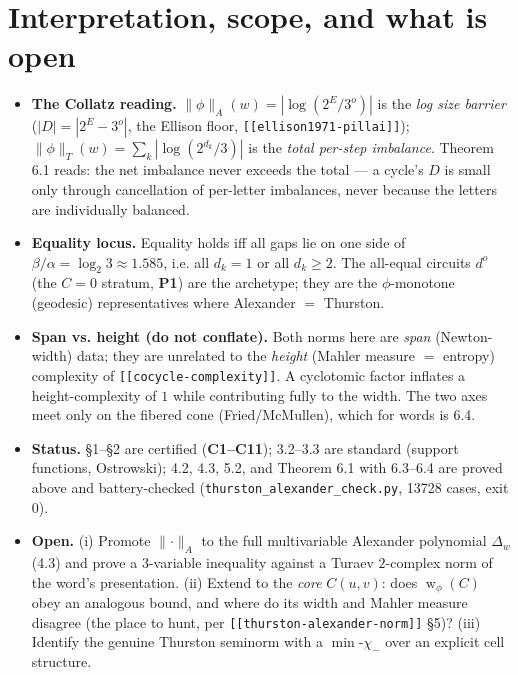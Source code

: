 \documentclass[11pt]{article}
\begin{document}
\hrulefill

\section{Interpretation, scope, and what is open}

\begin{itemize}[leftmargin=*]
  \item \textbf{The Collatz reading.} $\lVert\phi\rVert_A(w)=|\log(2^{E}/3^{o})|$ is
  the \emph{log size barrier} ($|D|=|2^{E}-3^{o}|$, the Ellison floor,
  \texttt{[[ellison1971-pillai]]}); $\lVert\phi\rVert_T(w)=\sum_k|\log(2^{d_k}/3)|$ is
  the \emph{total per-step imbalance}. Theorem 6.1 reads: the net imbalance never
  exceeds the total --- a cycle's $D$ is small only through cancellation of per-letter
  imbalances, never because the letters are individually balanced.
  \item \textbf{Equality locus.} Equality holds iff all gaps lie on one side of
  $\beta/\alpha=\log_2 3\approx1.585$, i.e. all $d_k=1$ or all $d_k\ge2$. The all-equal
  circuits $d^{o}$ (the $C=0$ stratum, \textbf{P1}) are the archetype; they are the
  $\phi$-monotone (geodesic) representatives where Alexander $=$ Thurston.
  \item \textbf{Span vs. height (do not conflate).} Both norms here are \emph{span}
  (Newton-width) data; they are unrelated to the \emph{height} (Mahler measure $=$
  entropy) complexity of \texttt{[[cocycle-complexity]]}. A cyclotomic factor inflates a
  height-complexity of $1$ while contributing fully to the width. The two axes meet only
  on the fibered cone (Fried/McMullen), which for words is 6.4.
  \item \textbf{Status.} \S1--\S2 are certified (\textbf{C1--C11}); 3.2--3.3 are
  standard (support functions, Ostrowski); 4.2, 4.3, 5.2, and Theorem 6.1 with 6.3--6.4
  are proved above and battery-checked
  (\texttt{thurston\_\allowbreak alexander\_\allowbreak check.py}, 13728 cases, exit 0).
  \item \textbf{Open.} (i) Promote $\lVert\cdot\rVert_A$ to the full multivariable
  Alexander polynomial $\Delta_w$ (4.3) and prove a $3$-variable inequality against a
  Turaev $2$-complex norm of the word's presentation. (ii) Extend to the \emph{core}
  $C(u,v)$: does $\operatorname{w}_\phi(C)$ obey an analogous bound, and where do its
  width and Mahler measure disagree (the place to hunt, per
  \texttt{[[thurston-alexander-norm]]} \S5)? (iii) Identify the genuine Thurston
  seminorm with a $\min$-$\chi_-$ over an explicit cell structure.
\end{itemize}
\end{document}
